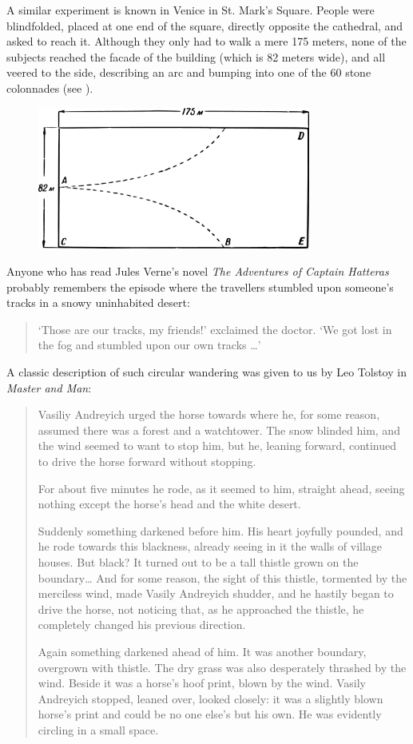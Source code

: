 A similar experiment is known in Venice in St. Mark's Square. People were blindfolded, placed at one end of the square, directly opposite the cathedral, and asked to reach it. Although they only had to walk a mere 175 meters, none of the subjects reached the facade of the building (which is 82 meters wide), and all veered to the side, describing an arc and bumping into one of the 60 stone colonnades (see ).


\begin{figure}[h!]
\centering
\includegraphics[width=0.8\textwidth]{figures/ch-08/fig-112.pdf}
\end{figure}


Anyone who has read Jules Verne's novel \emph{The Adventures of Captain Hatteras} probably remembers the episode where the travellers stumbled upon someone's tracks in a snowy uninhabited desert:
\begin{quote}
`Those are our tracks, my friends!' exclaimed the doctor. `We got lost in the fog and stumbled upon our own tracks \dots{}'
\end{quote}
A classic description of such circular wandering was given to us by Leo Tolstoy in \emph{Master and Man}:
\begin{quote}
Vasiliy Andreyich urged the horse towards where he, for some reason, assumed there was a forest and a watchtower. The snow blinded him, and the wind seemed to want to stop him, but he, leaning forward, continued to drive the horse forward without stopping.

For about five minutes he rode, as it seemed to him, straight ahead, seeing nothing except the horse's head and the white desert.

Suddenly something darkened before him. His heart joyfully pounded, and he rode towards this blackness, already seeing in it the walls of village houses. But black? It turned out to be a tall thistle grown on the boundary\dots{} And for some reason, the sight of this thistle, tormented by the merciless wind, made Vasily Andreyich shudder, and he hastily began to drive the horse, not noticing that, as he approached the thistle, he completely changed his previous direction.

Again something darkened ahead of him. It was another boundary, overgrown with thistle. The dry grass was also desperately thrashed by the wind. Beside it was a horse's hoof print, blown by the wind. Vasily Andreyich stopped, leaned over, looked closely: it was a slightly blown horse's print and could be no one else's but his own. He was evidently circling in a small space.
\end{quote}

